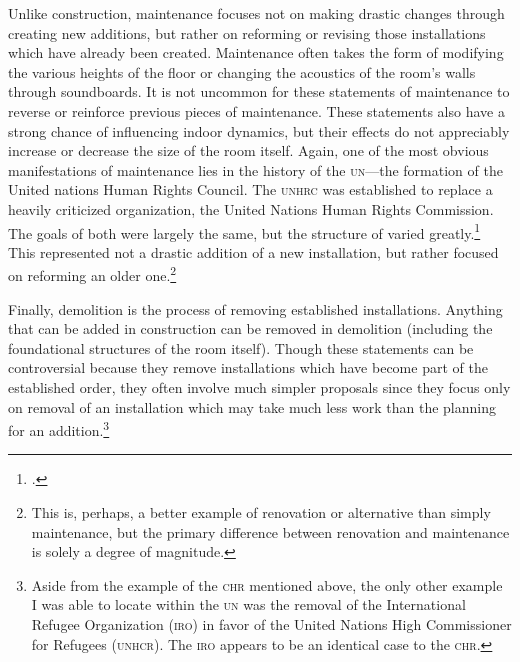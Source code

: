 \documentclass[openany,twoside]{memoir}
\begin{document}
\begin{Spacing}{2}
Unlike construction, maintenance focuses not on making drastic changes through creating new additions, but rather on reforming or revising those installations which have already been created.
Maintenance often takes the form of modifying the various heights of the floor or changing the acoustics of the room's walls through soundboards.
It is not uncommon for these statements of maintenance to reverse or reinforce previous pieces of maintenance.
These statements also have a strong chance of influencing indoor dynamics, but their effects do not appreciably increase or decrease the size of the room itself.
Again, one of the most obvious manifestations of maintenance lies in the history of the \textsc{un}---the formation of the United nations Human Rights Council.
The \textsc{unhrc} was established to replace a heavily criticized organization, the United Nations Human Rights Commission.
The goals of both were largely the same, but the structure of varied greatly.\footcite{bbc06}
This represented not a drastic addition of a new installation, but rather focused on reforming an older one.\footnote{
This is, perhaps, a better example of renovation or alternative than simply maintenance, but the primary difference between renovation and maintenance is solely a degree of magnitude.}

Finally, demolition is the process of removing established installations.
Anything that can be added in construction can be removed in demolition (including the foundational structures of the room itself).
Though these statements can be controversial because they remove installations which have become part of the established order, they often involve much simpler proposals since they focus only on removal of an installation which may take much less work than the planning for an addition.\footnote{
Aside from the example of the \textsc{chr} mentioned above, the only other example I was able to locate within the \textsc{un} was the removal of the International Refugee Organization (\textsc{iro}) in favor of the United Nations High Commissioner for Refugees (\textsc{unhcr}).
The \textsc{iro} appears to be an identical case to the \textsc{chr}.}


\end{Spacing}
\end{document}
